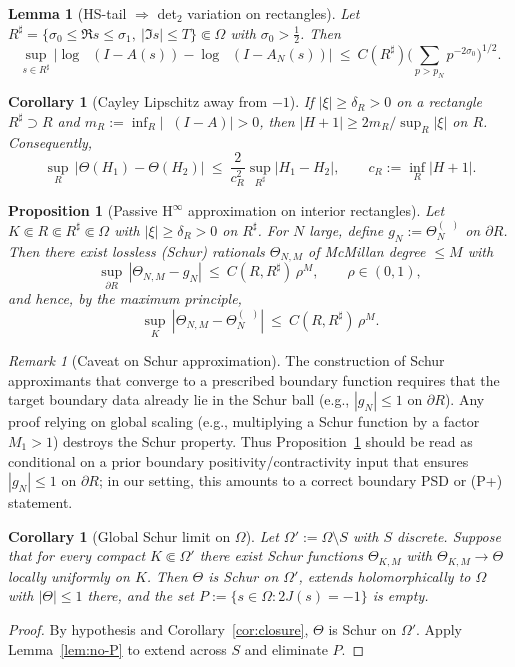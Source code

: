 \documentclass[11pt]{article}
\newtheorem{proposition}[theorem]{Proposition}
\newtheorem{lemma}[theorem]{Lemma}
\newtheorem{corollary}[theorem]{Corollary}
\theoremstyle{definition}
\theoremstyle{remark}
\newtheorem{remark}[theorem]{Remark}
\DeclareMathOperator{\dettwo}{det_2}
\begin{document}
\begin{lemma}[HS-tail \(\Rightarrow\) det$_2$ variation on rectangles]\label{lem:HS-tail-rectangle}
Let \(R^\sharp=\{\sigma_0\le \Re s\le \sigma_1,\ |\Im s|\le T\}\Subset\Omega\) with \(\sigma_0>\tfrac12\). Then
\[
 \sup_{s\in R^\sharp}\big|\log\dettwo(I-A(s))\!-\!\log\dettwo(I-A_N(s))\big|\ \le\ C(R^\sharp)\Big(\sum_{p>p_N}p^{-2\sigma_0}\Big)^{1/2}.
\]
\end{lemma}

\begin{corollary}[Cayley Lipschitz away from \(-1\)]\label{cor:Cayley-rect}
If \(|\xi|\ge \delta_R>0\) on a rectangle \(R^\sharp\supset R\) and \(m_R:=\inf_{R}|\dettwo(I-A)|>0\), then \(|H+1|\ge 2m_R/\sup_{R}|\xi|\) on \(R\). Consequently,
\[
 \sup_{R}\,\big|\Theta(H_1)-\Theta(H_2)\big|\ \le\ \frac{2}{c_R^2}\sup_{R^\sharp}|H_1-H_2|,\qquad c_R:=\inf_{R}|H+1|.
\]
\end{corollary}

\begin{proposition}[Passive H$^\infty$ approximation on interior rectangles]\label{prop:hinf-passive}
Let \(K\Subset R\Subset R^\sharp\Subset\Omega\) with \(|\xi|\ge \delta_R>0\) on \(R^\sharp\). For \(N\) large, define \(g_N:=\Theta_N^{(\dettwo)}\) on \(\partial R\). Then there exist lossless (Schur) rationals \(\Theta_{N,M}\) of McMillan degree \(\le M\) with
\[
 \sup_{\partial R}\,|\Theta_{N,M}-g_N|\ \le\ C(R,R^\sharp)\,\rho^{M},\qquad \rho\in(0,1),
\]
and hence, by the maximum principle,
\[
 \sup_{K}\,|\Theta_{N,M}-\Theta_N^{(\dettwo)}|\ \le\ C(R,R^\sharp)\,\rho^{M}.
\]
\end{proposition}

\begin{remark}[Caveat on Schur approximation]
The construction of Schur approximants that converge to a prescribed boundary function requires that the target boundary data already lie in the Schur ball (e.g., \(|g_N|\le 1\) on \(\partial R\)). Any proof relying on global scaling (e.g., multiplying a Schur function by a factor \(M_1>1\)) destroys the Schur property. Thus Proposition~\ref{prop:hinf-passive} should be read as conditional on a prior boundary positivity/contractivity input that ensures \(|g_N|\le 1\) on \(\partial R\); in our setting, this amounts to a correct boundary PSD or (P+) statement.
\end{remark}

\begin{corollary}[Global Schur limit on \(\Omega\)]
Let \(\Omega':=\Omega\setminus S\) with \(S\) discrete. Suppose that for every compact \(K\Subset\Omega'\) there exist Schur functions \(\Theta_{K,M}\) with \(\Theta_{K,M}\to\Theta\) locally uniformly on \(K\). Then \(\Theta\) is Schur on \(\Omega'\), extends holomorphically to \(\Omega\) with \(|\Theta|\le 1\) there, and the set \(P:=\{s\in\Omega: 2J(s)=-1\}\) is empty.
\end{corollary}
\begin{proof}
By hypothesis and Corollary~\ref{cor:closure}, \(\Theta\) is Schur on \(\Omega'\). Apply Lemma~\ref{lem:no-P} to extend across \(S\) and eliminate \(P\). 
\end{proof}
\end{document}
